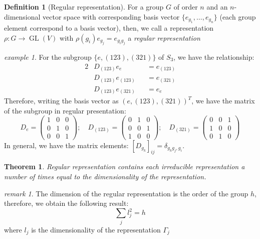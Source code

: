 \documentclass{amsart}
\newtheorem*{theorem}{Theorem}
\theoremstyle{remark}
\newtheorem*{remark}{remark}
\theoremstyle{remark}
\newtheorem*{example}{example}
\theoremstyle{definition}
\newtheorem*{definition}{Definition}
\DeclareMathOperator{\GL}{GL}
\begin{document}
\begin{definition}
    [Regular representation]
    For a group $G$ of order $n$ and an $n$-dimensional vector space with corresponding basis vector 
    $\{e_{g_1},\dots,e_{g_n}\}$ (each group element correspond to a basis vector), then, 
    we call a representation $\rho\colon G\to \GL(V)$ with $\rho(g_i) e_{g_j} = e_{g_i g_j}$
    a \emph{regular representation}
\end{definition}
\begin{example}
For the subgroup $\{e, (123), (321)\}$ of $S_3$, we have the relationship:
\begin{alignat*}{2}
    &D_{(123)} e_e &&= e_{(123)} \\
    &D_{(123)} e_{(123)} &&= e_{(321)} \\
    &D_{(123)} e_{(321)} &&= e_{e}
\end{alignat*}
Therefore, writing the basis vector as $(e, (123), (321))^T$, we have the matrix of the subgroup
in regular presentation:
\begin{equation*}
    D_{e} = \left(\begin{matrix}
        1 & 0 & 0 \\
        0 & 1 & 0 \\
        0 & 0 & 1 
    \end{matrix}\right);\quad D_{(123)} = \left(\begin{matrix}
        0 & 1 & 0 \\
        0 & 0 & 1 \\
        1 & 0 & 0 
    \end{matrix}\right);\quad D_{(321)} = \left(\begin{matrix}
        0 & 0 & 1 \\
        1 & 0 & 0 \\
        0 & 1 & 0 
    \end{matrix}\right)
\end{equation*}
In general, we have the matrix elements: $\left[D_{g_k}\right]_{ij} = \delta_{g_k g_j, g_i}$.
\end{example}

\begin{theorem}
    Regular representation contains each irreducible representation a number of times equal
    to the dimensionality of the representation.
\end{theorem}
\begin{remark}
    The dimension of the regular representation is the order of the group $h$, therefore, we obtain 
    the following result:
    \begin{equation*}
        \sum_j l_j^2 = h
    \end{equation*}
    where $l_j$ is the dimensionality of the representation $\Gamma_j$
\end{remark}
\end{document}
